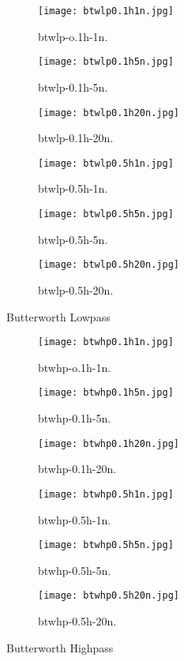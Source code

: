 \documentclass[14pt]{article}
\begin{document}
\begin{figure}[hbt!]
	\centering
	\begin{subfigure}[b]{0.3\linewidth}
		\texttt{[image: btwlp0.1h1n.jpg]}
		\caption{btwlp-o.1h-1n.}
	\end{subfigure}
	\begin{subfigure}[b]{0.3\linewidth}
		\texttt{[image: btwlp0.1h5n.jpg]}
		\caption{btwlp-0.1h-5n.}
	\end{subfigure}
	\begin{subfigure}[b]{0.3\linewidth}
			\texttt{[image: btwlp0.1h20n.jpg]}
			\caption{btwlp-0.1h-20n.}
	\end{subfigure}
		\begin{subfigure}[b]{0.3\linewidth}
		\texttt{[image: btwlp0.5h1n.jpg]}
		\caption{btwlp-0.5h-1n.}
	\end{subfigure}
	\begin{subfigure}[b]{0.3\linewidth}
		\texttt{[image: btwlp0.5h5n.jpg]}
		\caption{btwlp-0.5h-5n.}
	\end{subfigure}
		\begin{subfigure}[b]{0.3\linewidth}
			\texttt{[image: btwlp0.5h20n.jpg]}
			\caption{btwlp-0.5h-20n.}
		\end{subfigure}
			\caption{Butterworth Lowpass}
\end{figure}
\newpage
\begin{figure}[hbt!]
	\centering
	\begin{subfigure}[b]{0.3\linewidth}
		\texttt{[image: btwhp0.1h1n.jpg]}
		\caption{btwhp-o.1h-1n.}
	\end{subfigure}
	\begin{subfigure}[b]{0.3\linewidth}
		\texttt{[image: btwhp0.1h5n.jpg]}
		\caption{btwhp-0.1h-5n.}
	\end{subfigure}
		\begin{subfigure}[b]{0.3\linewidth}
			\texttt{[image: btwhp0.1h20n.jpg]}
			\caption{btwhp-0.1h-20n.}
	\end{subfigure}	
			\begin{subfigure}[b]{0.3\linewidth}
				\texttt{[image: btwhp0.5h1n.jpg]}
				\caption{btwhp-0.5h-1n.}
			\end{subfigure}
			\begin{subfigure}[b]{0.3\linewidth}
				\texttt{[image: btwhp0.5h5n.jpg]}
				\caption{btwhp-0.5h-5n.}
			\end{subfigure}
				\begin{subfigure}[b]{0.3\linewidth}
					\texttt{[image: btwhp0.5h20n.jpg]}
					\caption{btwhp-0.5h-20n.}
				\end{subfigure}
					\caption{Butterworth Highpass}
	\end{figure}
	
\end{document}
